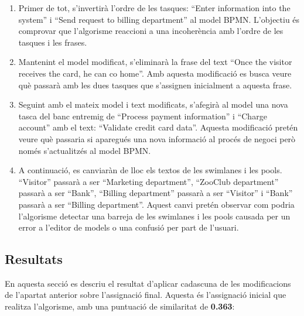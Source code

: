 \begin{enumerate}
    \item Primer de tot, s'invertirà l'ordre de les tasques: ``Enter information into the system'' i ``Send request to billing department'' al model BPMN. L'objectiu és comprovar que l'algorisme reaccioni a una incoherència amb l'ordre de les tasques i les frases.
    \item Mantenint el model modificat, s'eliminarà la frase del text ``Once the visitor receives the card, he can co home''. Amb aquesta modificació es busca veure què passarà amb les dues tasques que s'assignen inicialment a aquesta frase.
    \item Seguint amb el mateix model i text modificats, s'afegirà al model una nova tasca del banc entremig de ``Process payment information'' i ``Charge account'' amb el text: ``Validate credit card data''. Aquesta modificació pretén veure què passaria si aparegués una nova informació al procés de negoci però només s'actualitzés al model BPMN.
    \item A continuació, es canviaràn de lloc els textos de les swimlanes i les pools. ``Visitor'' passarà a ser ``Marketing department'', ``ZooClub department'' passarà a ser ``Bank'', ``Billing department'' passarà a ser ``Visitor'' i ``Bank'' passarà a ser ``Billing department''. Aquest canvi pretén observar com podria l'algorisme detectar una barreja de les swimlanes i les pools causada per un error a l'editor de models o una confusió per part de l'usuari.
\end{enumerate}

\subsection{Resultats}

En aquesta secció es descriu el resultat d'aplicar cadascuna de les modificacions de l'apartat anterior sobre l'assignació final. Aquesta és l'assignació inicial que realitza l'algorisme, amb una puntuació de similaritat de \textbf{0.363}:


